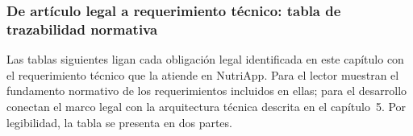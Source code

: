 \documentclass[12pt, a4paper]{article}
\begin{document}
\subsubsection{De artículo legal a requerimiento técnico: tabla
de trazabilidad normativa}

Las tablas siguientes ligan cada obligación legal identificada en
este capítulo con el requerimiento técnico que la atiende en
NutriApp. Para el lector muestran el fundamento normativo de los
requerimientos incluidos en ellas; para el desarrollo conectan el
marco legal con la arquitectura técnica descrita en el
capítulo~5. Por legibilidad, la tabla se presenta en dos partes.
\end{document}
